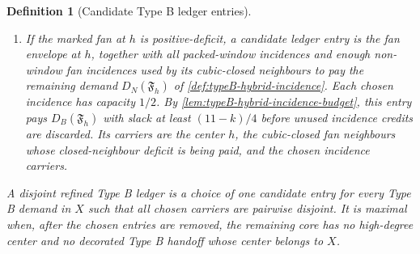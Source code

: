 \documentclass[11pt]{article}
\newtheorem{definition}[theorem]{Definition}
\newcommand{\ch}{\operatorname{ch}}
\begin{document}
\begin{definition}[Candidate Type B ledger entries]
\begin{enumerate}[label=(\alph*), leftmargin=2.2em]
The test is a lower-bound calculation in the actual induced-core ledger, not
an equality obtained by forgetting external incidences.  Summing
\textup{(B-port-transfer)} transfers it to the displayed augmented-charge
inequality.  For a positive-deficit entry, every packed-window incidence is an
external assigned shoulder and is paid from the corresponding $4e_h(u)$
correction.  A selected non-window half-credit is allowed only when its remote
endpoint $z$ is an ordinary available core vertex: $z\in Y_X\setminus H_X$,
$z$ is adjacent to no assigned center, and $4\ch_X(z)\ge2$.  These ordinary
vertices, the complete fan-neighbour support, and the certificate-selected
vertices are included in the candidate carrier support, so B2 disjointness
prevents their charge from being used twice.
Its carriers are the center $h$ together with the vertices of $A_h$.
\item If the marked fan at $h$ is positive-deficit, a candidate ledger entry is
the fan envelope at $h$, together with all packed-window incidences and enough
non-window fan incidences used by its cubic-closed neighbours to pay the
remaining demand $D_N(\mathfrak F_h)$ of
\cref{def:typeB-hybrid-incidence}.  Each chosen incidence has capacity $1/2$.
By \cref{lem:typeB-hybrid-incidence-budget}, this entry pays
$D_B(\mathfrak F_h)$ with slack at least $(11-k)/4$ before unused incidence
credits are discarded.  Its carriers are the center $h$, the cubic-closed fan
neighbours whose closed-neighbour deficit is being paid, and the chosen
incidence carriers.
\end{enumerate}
A \emph{disjoint refined Type B ledger} is a choice of one candidate entry for
every Type B demand in $X$ such that all chosen carriers are pairwise disjoint.
It is \emph{maximal} when, after the chosen entries are removed, the remaining
core has no high-degree center and no decorated Type B handoff whose center
belongs to $X$.
\end{definition}
\end{document}
